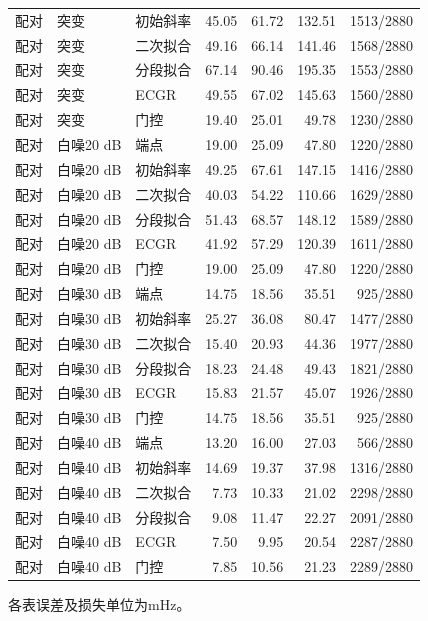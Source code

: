 \begin{longtable}{lllrrrr}
配对 & 突变 & 初始斜率 & 45.05 & 61.72 & 132.51 & 1513/2880 \\
配对 & 突变 & 二次拟合 & 49.16 & 66.14 & 141.46 & 1568/2880 \\
配对 & 突变 & 分段拟合 & 67.14 & 90.46 & 195.35 & 1553/2880 \\
配对 & 突变 & ECGR & 49.55 & 67.02 & 145.63 & 1560/2880 \\
配对 & 突变 & 门控 & 19.40 & 25.01 & 49.78 & 1230/2880 \\
配对 & 白噪20 dB & 端点 & 19.00 & 25.09 & 47.80 & 1220/2880 \\
配对 & 白噪20 dB & 初始斜率 & 49.25 & 67.61 & 147.15 & 1416/2880 \\
配对 & 白噪20 dB & 二次拟合 & 40.03 & 54.22 & 110.66 & 1629/2880 \\
配对 & 白噪20 dB & 分段拟合 & 51.43 & 68.57 & 148.12 & 1589/2880 \\
配对 & 白噪20 dB & ECGR & 41.92 & 57.29 & 120.39 & 1611/2880 \\
配对 & 白噪20 dB & 门控 & 19.00 & 25.09 & 47.80 & 1220/2880 \\
配对 & 白噪30 dB & 端点 & 14.75 & 18.56 & 35.51 & 925/2880 \\
配对 & 白噪30 dB & 初始斜率 & 25.27 & 36.08 & 80.47 & 1477/2880 \\
配对 & 白噪30 dB & 二次拟合 & 15.40 & 20.93 & 44.36 & 1977/2880 \\
配对 & 白噪30 dB & 分段拟合 & 18.23 & 24.48 & 49.43 & 1821/2880 \\
配对 & 白噪30 dB & ECGR & 15.83 & 21.57 & 45.07 & 1926/2880 \\
配对 & 白噪30 dB & 门控 & 14.75 & 18.56 & 35.51 & 925/2880 \\
配对 & 白噪40 dB & 端点 & 13.20 & 16.00 & 27.03 & 566/2880 \\
配对 & 白噪40 dB & 初始斜率 & 14.69 & 19.37 & 37.98 & 1316/2880 \\
配对 & 白噪40 dB & 二次拟合 & 7.73 & 10.33 & 21.02 & 2298/2880 \\
配对 & 白噪40 dB & 分段拟合 & 9.08 & 11.47 & 22.27 & 2091/2880 \\
配对 & 白噪40 dB & ECGR & 7.50 & 9.95 & 20.54 & 2287/2880 \\
配对 & 白噪40 dB & 门控 & 7.85 & 10.56 & 21.23 & 2289/2880 \\
\bottomrule
\end{longtable}
\normalsize 各表误差及损失单位为mHz。
